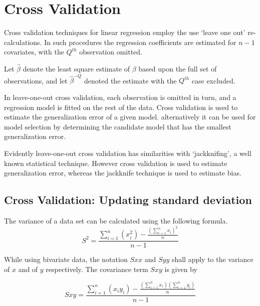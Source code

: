 \documentclass[a4paper,12pt]{article}
\begin{document}
\newpage
\section{Cross Validation} %


Cross validation techniques for linear regression employ the use `leave one out' re-calculations. In such procedures the regression coefficients are estimated for $n-1$ covariates, with the $Q^{th}$ observation omitted.


Let $\hat{\beta}$ denote the least square estimate of $\beta$ based upon the full set of observations, and let
$\hat{\beta}^{-Q}$ denoted the estimate with the $Q^{th}$ case
excluded.




In leave-one-out cross validation, each observation is omitted in turn, and a regression model is fitted on the rest of the data. Cross validation is used to estimate the generalization error of a given model. alternatively it can be used for model selection by determining the candidate model that has the smallest generalization error.




Evidently leave-one-out cross validation has similarities with `jackknifing', a well known statistical technique. However cross validation is used to estimate generalization error, whereas the jackknife technique is used to estimate bias.


\newpage

\subsection{Cross Validation: Updating standard deviation} %


The variance of a data set can be calculated using the following formula.
\begin{equation}
S^{2}=\frac{\sum_{i=1}^{n}(x_{i}^{2})-\frac{(\sum_{i=1}^{n}x_{i})^{2}}{n}}{n-1}
\end{equation}


While using bivariate data, the notation $Sxx$ and $Syy$ shall apply to the variance of $x$ and of $y$ respectively. The covariance term $Sxy$ is given by


\begin{equation}
Sxy=\frac{\sum_{i=1}^{n}(x_{i}y_{i})-\frac{(\sum_{i=1}^{n}x_{i})(\sum_{i=1}^{n}y_{i})}{n}}{n-1}
\end{equation}
\end{document}
